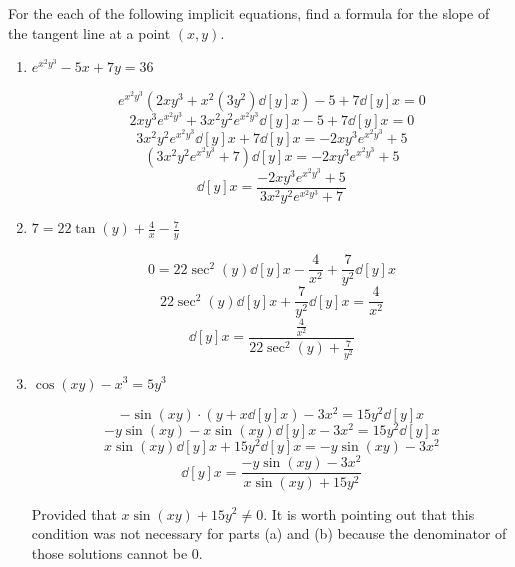 \documentclass[nooutcomes]{ximera}
\begin{document}
\begin{problem}
  For the each of the following implicit equations, find a formula for the slope of the tangent line at a point $(x, y)$.

	\begin{enumerate}
	
	\item  $e^{x^2 y^3} - 5x + 7y = 36$
			\begin{freeResponse}
			$$ e^{x^2 y^3} \left( 2xy^3 + x^2 (3y^2)\dd[y]{x} \right) - 5 + 7\dd[y]{x} = 0 $$
			$$ 2xy^3 e^{x^2y^3} + 3x^2y^2e^{x^2y^3}\dd[y]{x} - 5 + 7\dd[y]{x} = 0 $$
			$$ 3x^2y^2e^{x^2y^3}\dd[y]{x} + 7\dd[y]{x} = -2xy^3 e^{x^2y^3} + 5 $$
			$$ \left( 3x^2y^2e^{x^2y^3} + 7 \right) \dd[y]{x} = -2xy^3 e^{x^2y^3} + 5 $$
			$$  \dd[y]{x} = \frac{-2xy^3 e^{x^2y^3} + 5}{3x^2 y^2 e^{x^2y^3} + 7} $$
			\end{freeResponse}
			
			
			
	\item  $7 = 22 \tan(y) + \frac{4}{x} - \frac{7}{y}$
			\begin{freeResponse}
			$$ 0 = 22 \sec^2 (y) \dd[y]{x} - \frac{4}{x^2} + \frac{7}{y^2} \dd[y]{x} $$
			$$ 22 \sec^2(y) \dd[y]{x} + \frac{7}{y^2} \dd[y]{x} = \frac{4}{x^2} $$
			$$ \dd[y]{x} = \frac{\frac{4}{x^2}}{22 \sec^2(y) + \frac{7}{y^2}} $$
			\end{freeResponse}
			
			
			
	\item  $\cos(xy) - x^3 = 5y^3$
			\begin{freeResponse}
			$$ -\sin(xy) \cdot \left(y + x \dd[y]{x} \right) - 3x^2 = 15y^2 \dd[y]{x} $$
			$$ -y \sin(xy) - x \sin(xy) \dd[y]{x} - 3x^2 = 15y^2 \dd[y]{x} $$
			$$ x \sin(xy) \dd[y]{x} + 15y^2 \dd[y]{x} = -y \sin(xy) - 3x^2 $$
			$$ \dd[y]{x} = \frac{-y \sin(xy) - 3x^2}{x \sin(xy) + 15y^2} $$
			
			Provided that $x \sin(xy) + 15y^2 \neq 0$.  It is worth pointing out that this condition was not necessary for parts (a) and (b) because the denominator of those solutions cannot be $0$.  
			\end{freeResponse}
			
			
			
	\end{enumerate}
			
			
			
		
\end{problem}
	
\end{document}
